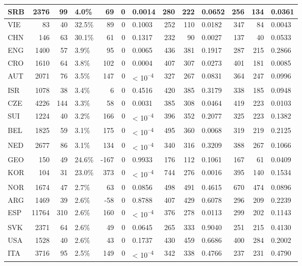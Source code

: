 \begin{tabular}{l|r|r|l|r|r|l|r|r|l|r|r|l}
\hline
SRB & 2376 & 99 & 4.0\% & 69 & 0 & 0.0014 & 280 & 222 & 0.0652 & 256 & 134 & 0.0361\\
\hline
VIE & 83 & 40 & 32.5\% & 89 & 0 & 0.1003 & 252 & 110 & 0.0182 & 347 & 84 & 0.0043\\
\hline
CHN & 146 & 63 & 30.1\% & 61 & 0 & 0.1317 & 232 & 90 & 0.0027 & 137 & 40 & 0.0533\\
\hline
ENG & 1400 & 57 & 3.9\% & 95 & 0 & 0.0065 & 436 & 381 & 0.1917 & 287 & 215 & 0.2866\\
\hline
CRO & 1610 & 64 & 3.8\% & 102 & 0 & 0.0004 & 407 & 307 & 0.0273 & 401 & 181 & 0.0085\\
\hline
AUT & 2071 & 76 & 3.5\% & 147 & 0 & < 10\textsuperscript{--4} & 327 & 267 & 0.0831 & 364 & 247 & 0.0996\\
\hline
ISR & 1078 & 38 & 3.4\% & 6 & 0 & 0.4516 & 420 & 385 & 0.3179 & 338 & 185 & 0.0948\\
\hline
CZE & 4226 & 144 & 3.3\% & 58 & 0 & 0.0031 & 385 & 308 & 0.0464 & 419 & 223 & 0.0103\\
\hline
SUI & 1224 & 40 & 3.2\% & 166 & 0 & < 10\textsuperscript{--4} & 396 & 352 & 0.2077 & 325 & 223 & 0.1382\\
\hline
BEL & 1825 & 59 & 3.1\% & 175 & 0 & < 10\textsuperscript{--4} & 495 & 360 & 0.0068 & 319 & 219 & 0.2125\\
\hline
NED & 2677 & 86 & 3.1\% & 134 & 0 & < 10\textsuperscript{--4} & 340 & 316 & 0.3209 & 388 & 267 & 0.1066\\
\hline
GEO & 150 & 49 & 24.6\% & -167 & 0 & 0.9933 & 176 & 112 & 0.1061 & 167 & 61 & 0.0409\\
\hline
KOR & 104 & 31 & 23.0\% & 373 & 0 & < 10\textsuperscript{--4} & 744 & 276 & 0.0016 & 395 & 140 & 0.1534\\
\hline
NOR & 1674 & 47 & 2.7\% & 63 & 0 & 0.0856 & 498 & 491 & 0.4615 & 670 & 474 & 0.0896\\
\hline
ARG & 1469 & 39 & 2.6\% & -58 & 0 & 0.8788 & 407 & 429 & 0.6078 & 296 & 209 & 0.2239\\
\hline
ESP & 11764 & 310 & 2.6\% & 160 & 0 & < 10\textsuperscript{--4} & 376 & 278 & 0.0113 & 299 & 202 & 0.1143\\
\hline
SVK & 2371 & 64 & 2.6\% & 49 & 0 & 0.0645 & 265 & 333 & 0.9040 & 251 & 215 & 0.4130\\
\hline
USA & 1528 & 40 & 2.6\% & 43 & 0 & 0.1737 & 430 & 459 & 0.6686 & 400 & 284 & 0.2002\\
\hline
ITA & 3716 & 95 & 2.5\% & 149 & 0 & < 10\textsuperscript{--4} & 342 & 338 & 0.4766 & 237 & 231 & 0.4790\\

\end{tabular}
